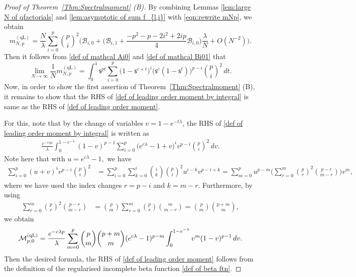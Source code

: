 \documentclass{amsart}
\theoremstyle{plain}
\theoremstyle{remark}
\numberwithin{equation}{section}
\begin{document}
\begin{proof}[Proof of Theorem~\ref{Thm:Spectralmoment} (B)]
By combining Lemmas \ref{lem:large N of qfactorials} and \ref{lem:asymptotic of sum f_{l,i}}  with \eqref{eqn:rewrite mNp}, we obtain 
    \begin{equation} \label{mNp interms of mathcal B}
        m_{N,p}^{(\mathrm{qL})}
        =\frac{N}{\lambda}\sum_{i=0}^{p}\binom{p}{i}^{2}\Big(\mathcal{B}_{i,0}+\Big(\mathcal{B}_{i,1}+\frac{-p^{2}-p-2i^2+2ip}{4}\mathcal{B}_{i,0}\Big)\frac{\lambda}{N}+O(N^{-2})\Big).
    \end{equation}
Then it follows from \eqref{def of mathcal Ai0} and \eqref{def of mathcal Bi01} that 
\begin{equation}  \label{def of leading order moment by integral}
\lim_{N \to \infty} \frac{ 1 }{N}m_{N,p}^{(\mathrm{qL})} =\int_{0}^{1} \mathsf{s}^{p t}\sum_{i=0}^{p}\Big(1-\mathsf{s}^{c+t}\Big)^{i}\Big(\mathsf{s}^{c}(1-\mathsf{s}^{t})\Big)^{p-i}\binom{p}{i}^{2}\,dt. 
\end{equation}
Now, in order to show the first assertion of Theorem~\ref{Thm:Spectralmoment} (B), it remains to show that the RHS of \eqref{def of leading order moment by integral} is same as the RHS of \eqref{def of leading order moment}. 

For this, note that by the change of variables $v=1-e^{- t\lambda}$, the RHS of \eqref{def of leading order moment by integral} is written as   
    \begin{align*}
       \frac{e^{-c\lambda p}}{\lambda} \int_{0}^{1-e^{-\lambda}}  (1-v)^{p-1} \sum_{i=0}^{p}\Big( e^{c\lambda}-1+v \Big)^{i}v^{p-i}\binom{p}{i}^{2}\,dv. 
    \end{align*}
    Note here that with $u=e^{c\lambda}-1,$ we have 
    \begin{align*}
        \sum_{i=0}^{p} ( u+v )^{i}v^{p-i}\binom{p}{i}^{2}& = \sum_{i=0}^p \sum_{k=0}^i  \binom{i}{k}\binom{p}{i}^{2} u^{i-k} v^{p-i+k}
        =\sum_{m=0}^p u^{p-m} \bigg( \sum_{r=0}^m \binom{p}{r}^2 \binom{p-r}{m-r} \bigg) v^m, 
    \end{align*}
    where we have used the index changes $r=p-i$ and $k=m-r$. Furthermore, by using 
    \begin{align*}
        \sum_{r=0}^m \binom{p}{r}^2 \binom{p-r}{m-r} &= \binom{p}{m} \sum_{r=0}^m  \binom{p}{r} \binom{m}{m-r} = \binom{p}{m} \binom{p+m}{m},  
    \end{align*}
    we obtain 
    \begin{align*}
        \mathcal{M}^{ \rm (qL) }_{p,0}=  \frac{e^{-c\lambda p}}{\lambda} \sum_{m=0}^p   \binom{p}{m} \binom{p+m}{m} (e^{c\lambda}-1)^{p-m} \int_{0}^{1-e^{-\lambda}} v^m  (1-v)^{p-1}   \,dv. 
    \end{align*}
    Then the desired formula, the RHS of \eqref{def of leading order moment} follows from the definition of the regularised incomplete beta function \eqref{def of beta ftn}. 
    

\end{proof}
\end{document}

